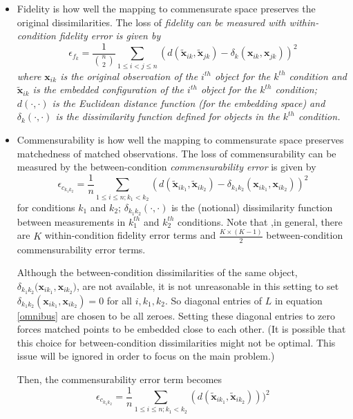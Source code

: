 \documentclass[11pt]{article} %
\begin{document}
\begin{itemize}
\item Fidelity is how well the mapping to commensurate space preserves the original dissimilarities. The loss of \em{fidelity} can be measured with  within-condition {\em fidelity error} is given by
    \[
\epsilon_{f_{k}} = \frac{1}{{{n}\choose{2}}} \sum_{1 \leq i < j \leq n} (d(\widetilde{\bm{x}}_{ik},\widetilde{\bm{x}}_{jk})-\delta_k(\bm{x}_{ik},\bm{x}_{jk}))^2
\] 
where ${\bm{x}}_{ik}$ is the original observation of the $i^{th}$ object for the $k^{th}$  condition and $\widetilde{\bm{x}}_{ik}$ is the embedded configuration of the $i^{th}$ object  for the $k^{th}$ condition;  $d(\cdot,\cdot)$ is the Euclidean distance function (for the embedding space) and $\delta_k(\cdot,\cdot)$ is the dissimilarity function defined for objects in the $k^{th}$ condition.

\item Commensurability is how well the mapping to commensurate space preserves matchedness of matched observations. The loss of commensurability can be measured by the between-condition {\em commensurability error} is given by
    \[
\epsilon_{c_{k_1k_2}} = \frac{1}{n} \sum_{1 \leq i \leq n;k_1 <k_2} (d(\widetilde{\bm{x}}_{ik_1},\widetilde{\bm{x}}_{ik_2})-{ \delta_{k_1k_2}}(\bm{x}_{ik_1},\bm{x}_{ik_2}))^2
\label{comm-error}
\]
 for conditions $k_1$ and $k_2$; $\delta_{{k_1}{k_2}}(\cdot,\cdot)$ is the (notional) dissimilarity function between measurements in  $k_1^{th}$ and $k_2^{th}$ conditions. Note that ,in general, there are $K$  within-condition fidelity error terms and $\frac{K \times (K-1)}{2}$  between-condition commensurability error terms.

Although  the between-condition dissimilarities of the same object, ${ \delta_{k_1k_2}(\bm{x}_{ik_1},\bm{x}_{ik_2}})$, are not available,  it is not unreasonable in this setting  to set ${ \delta_{k_1k_2}}(\bm{x}_{ik_1},\bm{x}_{ik_2}) = 0$ for all $i,k_1,k_2$.  So diagonal  entries of $L$ in  equation \eqref{omnibus} are  chosen to be all zeroes. Setting these diagonal entries to zero forces matched points to be embedded close to each other. (It is possible that this choice for between-condition dissimilarities might not be optimal. This issue will be ignored in order to focus on the main problem.)

Then, the commensurability error  term becomes
  \[
\epsilon_{c_{k_1k_2}} = \frac{1}{n} \sum_{1 \leq i \leq n;k_1< k_2} (d(\widetilde{\bm{x}}_{ik_1},\widetilde{\bm{x}}_{ik_2})))^2
\]
\end{itemize}
\end{document}
